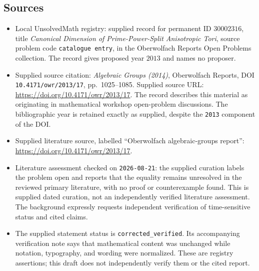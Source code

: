 \documentclass[11pt]{article}
\begin{document}
\subsection{Sources}
\begin{itemize}
\item Local UnsolvedMath registry: supplied record for permanent ID \(30002316\), title \emph{Canonical Dimension of Prime-Power-Split Anisotropic Tori}, source problem code \texttt{catalogue entry}, in the Oberwolfach Reports Open Problems collection. The record gives proposed year \(2013\) and names no proposer.
\item Supplied source citation: \emph{Algebraic Groups (2014)}, Oberwolfach Reports, DOI \texttt{10.4171/owr/2013/17}, pp.~1025--1085. Supplied source URL: \url{https://doi.org/10.4171/owr/2013/17}. The record describes this material as originating in mathematical workshop open-problem discussions. The bibliographic year is retained exactly as supplied, despite the \texttt{2013} component of the DOI.
\item Supplied literature source, labelled ``Oberwolfach algebraic-groups report'': \url{https://doi.org/10.4171/owr/2013/17}.
\item Literature assessment checked on \texttt{2026-08-21}: the supplied curation labels the problem open and reports that the equality remains unresolved in the reviewed primary literature, with no proof or counterexample found. This is supplied dated curation, not an independently verified literature assessment. The background expressly requests independent verification of time-sensitive status and cited claims.
\item The supplied statement status is \texttt{corrected\_verified}. Its accompanying verification note says that mathematical content was unchanged while notation, typography, and wording were normalized. These are registry assertions; this draft does not independently verify them or the cited report.
\end{itemize}
\end{document}
